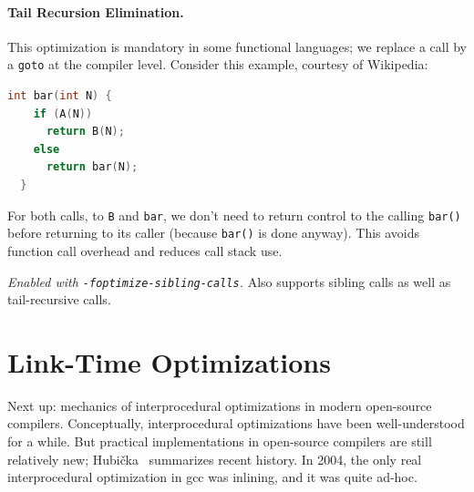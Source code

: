 \documentclass[a4paper]{report}
\begin{document}
\paragraph{Tail Recursion Elimination.} This optimization is mandatory
in some functional languages; we replace a call by a {\tt goto} at the
compiler level. Consider this example, courtesy of Wikipedia:

{\small
\begin{lstlisting}[language=C]
  int bar(int N) {
    if (A(N))
      return B(N);
    else
      return bar(N);
  }
\end{lstlisting}
}

For both calls, to {\tt B} and {\tt bar}, we don't need to return control
to the calling {\tt bar()} before returning to its caller (because {\tt bar()}
is done anyway). This avoids
function call overhead and reduces call stack use.

\noindent \emph{Enabled with {\tt -foptimize-sibling-calls}.} Also supports
sibling calls as well as tail-recursive calls.

\section*{Link-Time Optimizations}
Next up: mechanics of interprocedural optimizations in modern open-source
compilers. Conceptually, interprocedural optimizations have been well-understood
for a while. But practical implementations in open-source compilers are still
relatively new; Hubi\v{c}ka~\cite{hubicka14:_linkt_gcc} summarizes recent history.
In 2004, the only real interprocedural optimization in gcc was inlining, and it was
quite ad-hoc.
\end{document}
